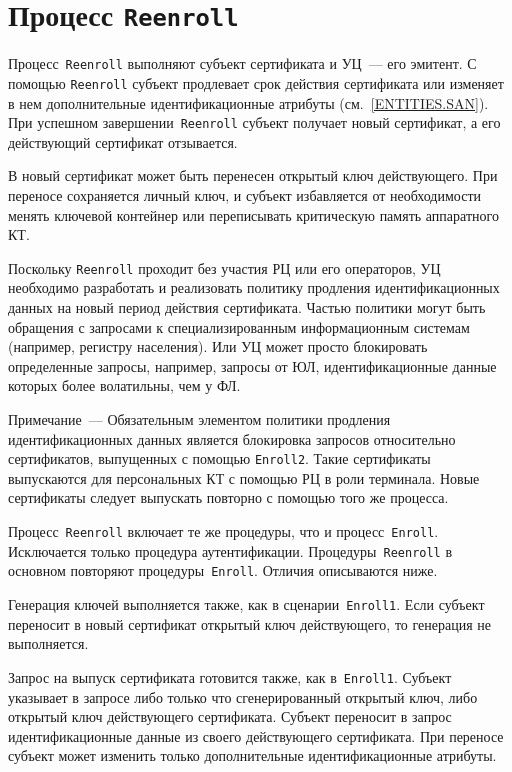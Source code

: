 \section{Процесс \texttt{Reenroll}}\label{PROCESSES.Reenroll}

Процесс~\texttt{Reenroll} выполняют субъект сертификата и УЦ~--- его 
эмитент. С помощью \texttt{Reenroll} субъект продлевает 
срок действия сертификата или изменяет в нем дополнительные
идентификационные атрибуты (см.~\ref{ENTITIES.SAN}).
%
При успешном завершении~\texttt{Reenroll} субъект получает новый 
сертификат, а его действующий сертификат отзывается. 

В новый сертификат может быть перенесен открытый ключ
действующего. При переносе сохраняется личный ключ,
и субъект избавляется от необходимости менять ключевой
контейнер или переписывать критическую память аппаратного КТ.

Поскольку \texttt{Reenroll} проходит без участия РЦ или его операторов,
УЦ необходимо разработать и реализовать политику продления 
идентификационных данных на новый период действия сертификата.
%
Частью политики могут быть обращения с запросами к специализированным 
информационным системам (например, регистру населения).
%
Или УЦ может просто блокировать определенные запросы, например, запросы от 
ЮЛ, идентификационные данные которых более волатильны, чем у ФЛ.

\begin{note}
Примечание~---
Обязательным элементом политики продления идентификационных данных
является блокировка запросов относительно сертификатов, выпущенных с 
помощью \texttt{Enroll2}. Такие сертификаты выпускаются для персональных 
КТ с помощью РЦ в роли терминала. Новые сертификаты следует выпускать 
повторно с помощью того же процесса.
\end{note}

Процесс~\texttt{Reenroll} включает те же процедуры, 
что и процесс~\texttt{Enroll}. Исключается только процедура 
аутентификации. Процедуры~\texttt{Reenroll} в основном повторяют 
процедуры~\texttt{Enroll}. Отличия описываются ниже.

Генерация ключей выполняется также, как в сценарии~\texttt{Enroll1}. 
Если субъект переносит в новый сертификат открытый ключ действующего, то 
генерация не выполняется. 

Запрос на выпуск сертификата готовится также, как в~\texttt{Enroll1}.
%
Субъект указывает в запросе либо только что сгенерированный открытый ключ,
либо открытый ключ действующего сертификата.
%
Субъект переносит в запрос идентификационные данные из своего действующего 
сертификата. При переносе субъект может изменить только дополнительные 
идентификационные атрибуты. 

